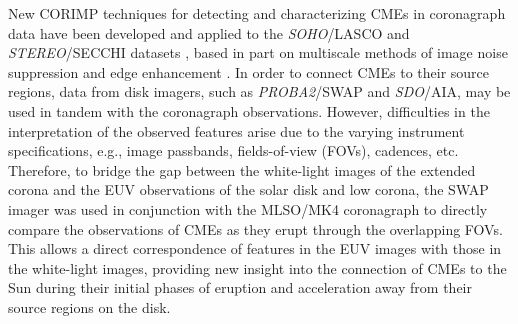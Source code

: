 \documentclass[preprint2]{aastex}
\begin{document}
New CORIMP techniques for detecting and characterizing CMEs in coronagraph data have been developed and applied to the \emph{SOHO}/LASCO and \emph{STEREO}/SECCHI datasets \citep{2012ApJ...752..144M, 2012ApJ...752..145B}, based in part on multiscale methods of image noise suppression and edge enhancement \citep{2009A&A...495..325B, 2008SoPh..248..457Y}. In order to connect CMEs to their source regions, data from disk imagers, such as \emph{PROBA2}/SWAP and \emph{SDO}/AIA, may be used in tandem with the coronagraph observations. However, difficulties in the interpretation of the observed features arise due to the varying instrument specifications, e.g., image passbands, fields-of-view (FOVs), cadences, etc. Therefore, to bridge the gap between the white-light images of the extended corona and the EUV observations of the solar disk and low corona, the SWAP imager was used in conjunction with the MLSO/MK4 coronagraph to directly compare the observations of CMEs as they erupt through the overlapping FOVs. This allows a direct correspondence of features in the EUV images with those in the white-light images, providing new insight into the connection of CMEs to the Sun during their initial phases of eruption and acceleration away from their source regions on the disk.


\end{document}
